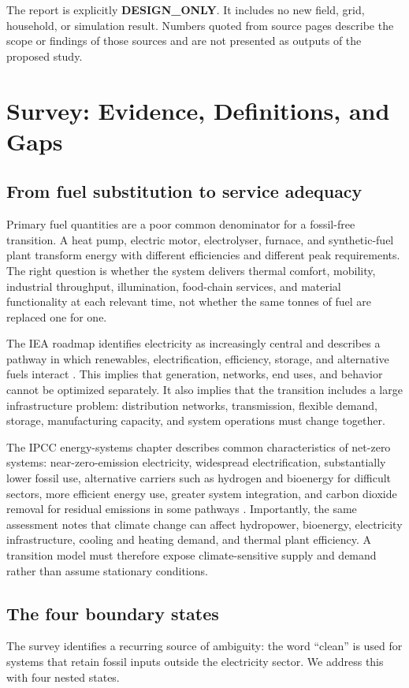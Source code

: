 \documentclass[conference]{IEEEtran}
\begin{document}
The report is explicitly \textbf{DESIGN\_ONLY}. It includes no new field, grid, household, or simulation result. Numbers quoted from source pages describe the scope or findings of those sources and are not presented as outputs of the proposed study.

\section{Survey: Evidence, Definitions, and Gaps}
\label{sec:survey}
\subsection{From fuel substitution to service adequacy}
Primary fuel quantities are a poor common denominator for a fossil-free transition. A heat pump, electric motor, electrolyser, furnace, and synthetic-fuel plant transform energy with different efficiencies and different peak requirements. The right question is whether the system delivers thermal comfort, mobility, industrial throughput, illumination, food-chain services, and material functionality at each relevant time, not whether the same tonnes of fuel are replaced one for one.

The IEA roadmap identifies electricity as increasingly central and describes a pathway in which renewables, electrification, efficiency, storage, and alternative fuels interact \cite{iea_nz}. This implies that generation, networks, end uses, and behavior cannot be optimized separately. It also implies that the transition includes a large infrastructure problem: distribution networks, transmission, flexible demand, storage, manufacturing capacity, and system operations must change together.

The IPCC energy-systems chapter describes common characteristics of net-zero systems: near-zero-emission electricity, widespread electrification, substantially lower fossil use, alternative carriers such as hydrogen and bioenergy for difficult sectors, more efficient energy use, greater system integration, and carbon dioxide removal for residual emissions in some pathways \cite{ipcc_wg3}. Importantly, the same assessment notes that climate change can affect hydropower, bioenergy, electricity infrastructure, cooling and heating demand, and thermal plant efficiency. A transition model must therefore expose climate-sensitive supply and demand rather than assume stationary conditions.

\subsection{The four boundary states}
The survey identifies a recurring source of ambiguity: the word ``clean'' is used for systems that retain fossil inputs outside the electricity sector. We address this with four nested states.
\end{document}
